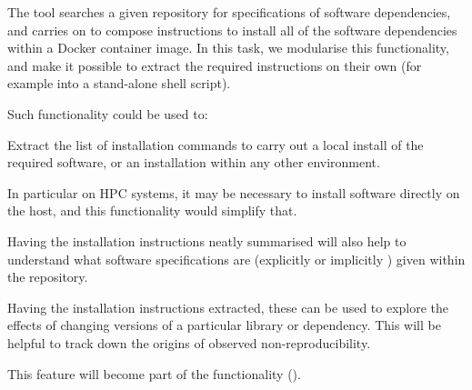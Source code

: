 \begin{task}[
  title=Extract software dependencies from repository,
  id=extract-dependencies,
  lead=SRL,
  PM=1,
  wphases={0-36},
  partners={MP}
  ]
The \repotodocker{} tool searches a given repository for specifications of
software dependencies, and carries on to compose instructions to install all of
the software dependencies within a Docker container image. In this task, we
modularise this functionality, and make it possible to extract the required
instructions on their own (for example into a stand-alone shell script).

Such functionality could be used to:
\begin{compactitem}
  \item Extract the list of installation commands to carry out a local install of
    the required software, or an installation within any other environment.
  \item In particular on HPC systems, it may be necessary to install software
    directly on the host, and this functionality would simplify that.
  \item Having the installation instructions neatly summarised will also help to
    understand what software specifications are (explicitly or implicitly )
    given within the repository.
  \item Having the installation instructions extracted, these can be used to
    explore the effects of changing versions of a particular library or
    dependency. This will be helpful to track down the origins of observed
    non-reproducibility.
  \end{compactitem}

  This feature will become part of the \repotodocker{} functionality
  ().

\end{task}
